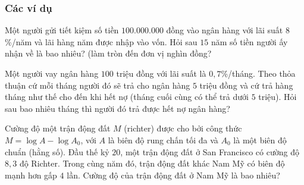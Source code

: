 \subsubsection{Các ví dụ}
\begin{vd}%
	Một người gửi tiết kiệm số tiền $100.000.000$ đồng vào ngân hàng với lãi suất $8$\%/năm và lãi hàng năm được nhập vào vốn. Hỏi sau $15$ năm số tiền người ấy nhận về là bao nhiêu? (làm tròn đến đơn vị nghìn đồng?
\end{vd}
\begin{vd}%
	Một người vay ngân hàng $100$ triệu đồng với lãi suất là $0,7$\%/tháng. Theo thỏa thuận cứ mỗi tháng người đó sẽ trả cho ngân hàng $5$ triệu đồng và cứ trả hàng tháng như thế cho đến khi hết nợ (tháng cuối cùng có thể trả dưới $5$ triệu). Hỏi sau bao nhiêu tháng thì người đó trả được hết nợ ngân hàng?
\end{vd}
\begin{vd}%
	Cường độ một trận động đất $M$ (richter) được cho bởi công thức $M = \log A -\log A_0$, với $A$ là biên độ rung chấn tối đa và $A_0$ là một biên độ chuẩn (hằng số). Đầu thế kỷ $20$, một trận động đất ở San Francisco có cường độ $8{,}3$ độ Richter. Trong cùng năm đó, trận động đất khác Nam Mỹ có biên độ mạnh hơn gấp $4$ lần. Cường độ của trận động đất ở Nam Mỹ là bao nhiêu?
\end{vd}

